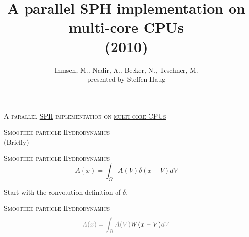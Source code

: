 \documentclass[14pt]{beamer}
\title{A parallel SPH implementation on multi-core
        CPUs\\[.1em]
    {\scriptsize (2010)}
}
\author{
    \small{Ihmsen, M., Nadir, A., Becker, N., Teschner, M.}\\[2em]
    \scriptsize{\color{gray}presented by Steffen Haug}
}
\date{}
\begin{document}
\begin{frame}
\titlepage
\end{frame}


\begin{frame}
\centering
{\scriptsize\textsc{
A parallel \underline{SPH} implementation
on \underline{multi-core CPUs}
}}
\\[2em]

\end{frame}

\begin{frame}
\centering
\textsc{Smoothed-particle Hydrodynamics}\\{\scriptsize
(Briefly)}
\end{frame}

\begin{frame}
\centering
{
\begin{minipage}[c][.7\textheight][t]{.9\textwidth}
\centering
\textsc{\scriptsize Smoothed-particle Hydrodynamics}\\[1em]

\begin{equation*}
    A(x) = \int_\Omega A(V)  \delta(x - V) dV
\end{equation*}

\vfill
{\scriptsize Start with the convolution definition of $\delta$.}
\end{minipage}
}
\end{frame}

\begin{frame}
\centering
{
\begin{minipage}[c][.7\textheight][t]{.9\textwidth}
\centering
\textsc{\scriptsize Smoothed-particle Hydrodynamics}\\[1em]
\begin{equation*}
    {\color{gray}A(x) = \int_\Omega A(V)} 
    W(x - V)
    {\color{gray}dV}
\end{equation*}
\vfill
{}


\end{minipage}
}
\end{frame}
\end{document}
